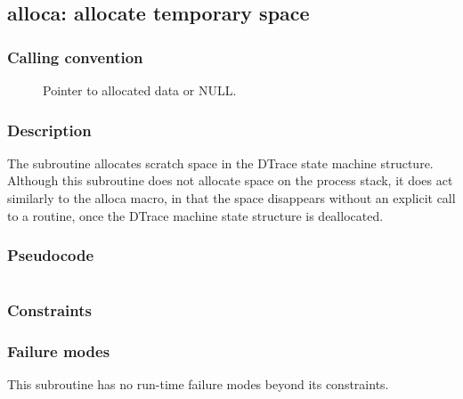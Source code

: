 \clearpage
{}
{}
\label{subr:alloca}
\subsection*{alloca: allocate temporary space}

\subsubsection*{Calling convention}

\begin{description}
\item[] Pointer to allocated data or NULL.
\end{description}

\subsubsection*{Description}

The  subroutine allocates scratch space in the
DTrace state machine structure.  Although this subroutine does not
allocate space on the process stack, it does act similarly to the
alloca macro, in that the space disappears without an explicit call to
a  routine, once the DTrace machine state structure
is deallocated.

\subsubsection*{Pseudocode}

\begin{verbatim}
\end{verbatim}

\subsubsection*{Constraints}

\subsubsection*{Failure modes}

This subroutine has no run-time failure modes beyond its constraints.
